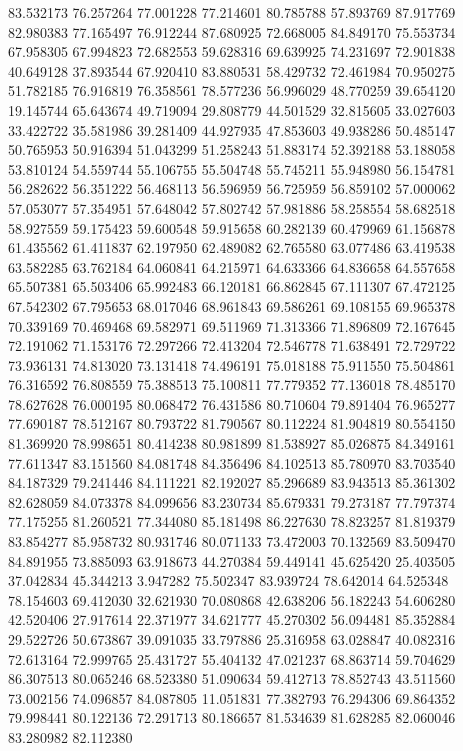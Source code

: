 83.532173
76.257264
77.001228
77.214601
80.785788
57.893769
87.917769
82.980383
77.165497
76.912244
87.680925
72.668005
84.849170
75.553734
67.958305
67.994823
72.682553
59.628316
69.639925
74.231697
72.901838
40.649128
37.893544
67.920410
83.880531
58.429732
72.461984
70.950275
51.782185
76.916819
76.358561
78.577236
56.996029
48.770259
39.654120
19.145744
65.643674
49.719094
29.808779
44.501529
32.815605
33.027603
33.422722
35.581986
39.281409
44.927935
47.853603
49.938286
50.485147
50.765953
50.916394
51.043299
51.258243
51.883174
52.392188
53.188058
53.810124
54.559744
55.106755
55.504748
55.745211
55.948980
56.154781
56.282622
56.351222
56.468113
56.596959
56.725959
56.859102
57.000062
57.053077
57.354951
57.648042
57.802742
57.981886
58.258554
58.682518
58.927559
59.175423
59.600548
59.915658
60.282139
60.479969
61.156878
61.435562
61.411837
62.197950
62.489082
62.765580
63.077486
63.419538
63.582285
63.762184
64.060841
64.215971
64.633366
64.836658
64.557658
65.507381
65.503406
65.992483
66.120181
66.862845
67.111307
67.472125
67.542302
67.795653
68.017046
68.961843
69.586261
69.108155
69.965378
70.339169
70.469468
69.582971
69.511969
71.313366
71.896809
72.167645
72.191062
71.153176
72.297266
72.413204
72.546778
71.638491
72.729722
73.936131
74.813020
73.131418
74.496191
75.018188
75.911550
75.504861
76.316592
76.808559
75.388513
75.100811
77.779352
77.136018
78.485170
78.627628
76.000195
80.068472
76.431586
80.710604
79.891404
76.965277
77.690187
78.512167
80.793722
81.790567
80.112224
81.904819
80.554150
81.369920
78.998651
80.414238
80.981899
81.538927
85.026875
84.349161
77.611347
83.151560
84.081748
84.356496
84.102513
85.780970
83.703540
84.187329
79.241446
84.111221
82.192027
85.296689
83.943513
85.361302
82.628059
84.073378
84.099656
83.230734
85.679331
79.273187
77.797374
77.175255
81.260521
77.344080
85.181498
86.227630
78.823257
81.819379
83.854277
85.958732
80.931746
80.071133
73.472003
70.132569
83.509470
84.891955
73.885093
63.918673
44.270384
59.449141
45.625420
25.403505
37.042834
45.344213
3.947282
75.502347
83.939724
78.642014
64.525348
78.154603
69.412030
32.621930
70.080868
42.638206
56.182243
54.606280
42.520406
27.917614
22.371977
34.621777
45.270302
56.094481
85.352884
29.522726
50.673867
39.091035
33.797886
25.316958
63.028847
40.082316
72.613164
72.999765
25.431727
55.404132
47.021237
68.863714
59.704629
86.307513
80.065246
68.523380
51.090634
59.412713
78.852743
43.511560
73.002156
74.096857
84.087805
11.051831
77.382793
76.294306
69.864352
79.998441
80.122136
72.291713
80.186657
81.534639
81.628285
82.060046
83.280982
82.112380
